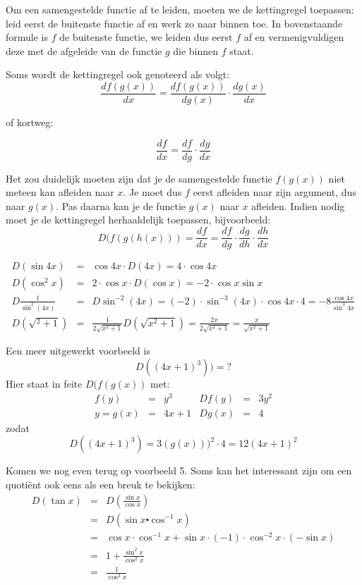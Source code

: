 Om een samengestelde functie af te leiden, moeten we de kettingregel toepassen: leid eerst de buitenste functie af en werk zo naar binnen toe. In bovenstaande formule is $f$ de buitenste functie, we leiden dus eerst $f$ af en vermenigvuldigen deze met de afgeleide van de functie $g$ die binnen $f$ staat.

Soms wordt de kettingregel ook genoteerd als volgt:
\[
\frac{df(g(x))}{dx}=\frac{df(g(x))}{dg(x)}\cdot\frac{dg(x)}{dx}
\]


of kortweg:

\[
\frac{df}{dx}=\frac{df}{dg}\cdot\frac{dg}{dx}
\]


Het zou duidelijk moeten zijn dat je de samengestelde functie $f(g(x))$
niet meteen kan afleiden naar $x$. Je moet dus $f$ eerst afleiden
naar zijn argument, dus naar $g(x)$. Pas daarna kan je de functie
$g(x)$ naar $x$ afleiden. Indien nodig moet je de kettingregel herhaaldelijk
toepassen, bijvoorbeeld: 
\[
D(f(g(h(x)))=\frac{df}{dx}=\frac{df}{dg}\cdot\frac{dg}{dh}\cdot\frac{dh}{dx}
\]
\medskip{}

\begin{voorbeeld}
\begin{eqnarray*}
D(\sin 4x) &=& \cos 4x \cdot D(4x) = 4 \cdot \cos 4x \\
D(\cos^2 x) &=& 2 \cdot \cos x \cdot D(\cos x) = -2 \cdot \cos x \sin x \\
D\frac{1}{\sin^{2}(4x)}&=&D\sin^{-2}(4x)=(-2)\cdot\sin^{-3}(4x)\cdot\cos4x\cdot4=-8\frac{\cos4x}{\sin^{3}4x} \\
D(\sqrt{^2+1}) &=& \frac{1}{2\sqrt{x^2+1}}D(\sqrt{x^2+1})=\frac{2x}{2\sqrt{x^2+1}} =\frac{x}{\sqrt{x^2+1}}
\end{eqnarray*}
\end{voorbeeld}

\begin{voorbeeld}
	Een meer uitgewerkt voorbeeld is 
	\[D((4x+1)^3))=?\]
	Hier staat in feite $D(f(g(x))$ met: 
	\[
	\begin{array}{rclrcl}
	f(y)&=&y^3 & Df(y)&=&3y^2 \\
	y=g(x)&=&4x+1 & Dg(x)&=&4 
	\end{array}
	\]
	zodat 
	\[D((4x+1)^3)=3(g(x)))^2 \cdot 4 = 12(4x+1)^2\]
\end{voorbeeld}

Komen we nog even terug op voorbeeld 5. Soms kan het interessant zijn
om een quotiënt ook eens als een breuk te bekijken:
\begin{eqnarray*}
	D\left(\tan x\right) & = & D\left(\frac{\sin x}{\cos x}\right)\\
	& = & D\left(\sin x\centerdot\cos^{-1}x\right)\\
	& = & \cos x\cdot\cos^{-1}x+\sin x\cdot(-1)\cdot\cos^{-2}x\cdot\left(-\sin x\right)\\
	& = & 1+\frac{\sin^{2}x}{\cos^{2}x}\\
	& = & \frac{1}{\cos^{2}x}
\end{eqnarray*}

